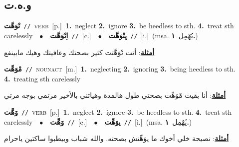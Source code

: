 \documentclass[10pt,a4paper,twoside]{article} %
\begin{document}
\begin{multicols}{2}
\vspace{-3mm}
\subsection*{\color{blue}\foreignlanguage{arabic}{و.ه.ت}\color{blue}{}} 

{\setlength\topsep{0pt}\textbf{\foreignlanguage{arabic}{تْوَهَّت}}\ {\color{gray}\texttt{//}\color{black}}\ \textsc{verb}\ [p.]\ \textbf{1.}~neglect  \textbf{2.}~ignore  \textbf{3.}~be heedless to sth.  \textbf{4.}~treat sth carelessly\ \ $\bullet$\ \ \setlength\topsep{0pt}\textbf{\foreignlanguage{arabic}{اِتْوَهَّت}}\ {\color{gray}\texttt{//}\color{black}}\ [c.]\ \ $\bullet$\ \ \setlength\topsep{0pt}\textbf{\foreignlanguage{arabic}{يِتْوَهَّت}}\ {\color{gray}\texttt{//}\color{black}}\ [i.]\ \color{gray}(msa. \foreignlanguage{arabic}{يُهْمِل}~\foreignlanguage{arabic}{\textbf{١.}})\color{black}\  \begin{flushright}\color{gray}\foreignlanguage{arabic}{\textbf{\underline{\foreignlanguage{arabic}{أمثلة}}}: أنت تْوَهَّتت كثير بصحتك وعافيتك وهيك مابينفع}\end{flushright}\color{black}} \vspace{2mm}

{\setlength\topsep{0pt}\textbf{\foreignlanguage{arabic}{مْوَهِّت}}\ {\color{gray}\texttt{//}\color{black}}\ \textsc{noun\textunderscore act}\ [m.]\ \textbf{1.}~neglecting  \textbf{2.}~ignoring  \textbf{3.}~being heedless to sth.  \textbf{4.}~treating sth carelessly\  \begin{flushright}\color{gray}\foreignlanguage{arabic}{\textbf{\underline{\foreignlanguage{arabic}{أمثلة}}}: أنا بقيت مْوَهِّت بصحتي طول هالمدة وهياتني بالأخير مرتمي بوجه مرتي}\end{flushright}\color{black}} \vspace{2mm}

{\setlength\topsep{0pt}\textbf{\foreignlanguage{arabic}{وَهَّت}}\ {\color{gray}\texttt{//}\color{black}}\ \textsc{verb}\ [p.]\ \textbf{1.}~neglect  \textbf{2.}~ignore  \textbf{3.}~be heedless to sth.  \textbf{4.}~treat sth carelessly\ \ $\bullet$\ \ \setlength\topsep{0pt}\textbf{\foreignlanguage{arabic}{وَهِّت}}\ {\color{gray}\texttt{//}\color{black}}\ [c.]\ \ $\bullet$\ \ \setlength\topsep{0pt}\textbf{\foreignlanguage{arabic}{يوَهِّت}}\ {\color{gray}\texttt{//}\color{black}}\ [i.]\ \color{gray}(msa. \foreignlanguage{arabic}{يُهْمِل}~\foreignlanguage{arabic}{\textbf{١.}})\color{black}\  \begin{flushright}\color{gray}\foreignlanguage{arabic}{\textbf{\underline{\foreignlanguage{arabic}{أمثلة}}}: نصيحة خلي أخوك ما يوَهِّتش بصحته. والله شباب وبيطبوا ساكتين ياحرام}\end{flushright}\color{black}} \vspace{2mm}


\end{multicols}
\end{document}

